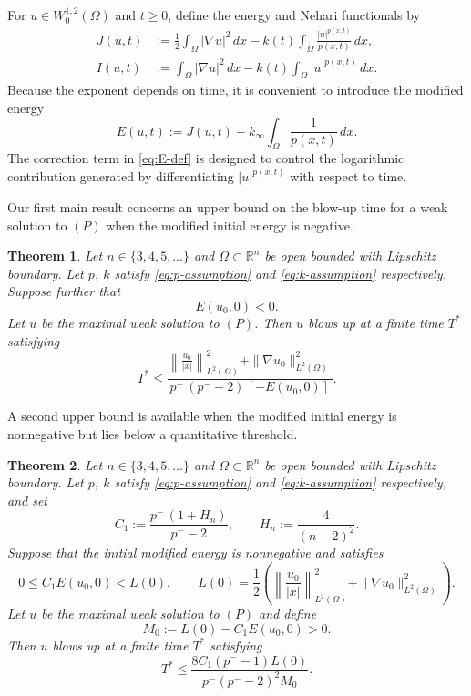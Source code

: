 \documentclass[12pt,reqno]{amsart}
\newtheorem{theorem}{Theorem}[section]
\theoremstyle{definition}
\theoremstyle{remark}
\numberwithin{equation}{section}
\newcommand{\R}{\mathbb{R}}
\begin{document}
For $u\in W^{1,2}_0(\Omega)$ and $t\ge0$, define the energy and Nehari functionals by
\begin{align}
J(u,t)
&:=\frac12\int_\Omega |\nabla u|^2\,dx
-k(t)\int_\Omega \frac{|u|^{p(x,t)}}{p(x,t)}\,dx,
\label{eq:J-def}\\
I(u,t)
&:=\int_\Omega |\nabla u|^2\,dx
-k(t)\int_\Omega |u|^{p(x,t)}\,dx.
\label{eq:I-def}
\end{align}
Because the exponent depends on time, it is convenient to introduce the modified energy
\begin{equation}\label{eq:E-def}
E(u,t):=J(u,t)+k_\infty\int_\Omega \frac{1}{p(x,t)}\,dx.
\end{equation}
The correction term in \eqref{eq:E-def} is designed to control the logarithmic contribution generated by differentiating $|u|^{p(x,t)}$ with respect to time.


Our first main result concerns an upper bound on the blow-up time for a weak solution to $(P)$ when the modified initial energy is negative.


\begin{theorem} \label{thm:negative}
	Let $n \in \{3,4,5,\ldots\}$ and $\Omega \subset \R^n$ be open bounded with Lipschitz boundary. 
	Let $p$, $k$ satisfy \eqref{eq:p-assumption} and \eqref{eq:k-assumption} respectively.
	Suppose further that 
	\[
	E(u_0,0) < 0.
	\]
	Let $u$ be the maximal weak solution to $(P)$.
	Then $u$ blows up at a finite time $T^*$ satisfying
	\[
	T^* 
	\le \frac{\left\| \displaystyle\frac{u_0}{|x|} \right\|_{L^2(\Omega)}^2+\|\nabla u_0\|_{L^2(\Omega)}^2}
	{p^- \, (p^- - 2) \, [-E(u_0,0)]}.
	\]
\end{theorem}


A second upper bound is available when the modified initial energy is nonnegative but lies below a quantitative threshold.


\begin{theorem} \label{thm:positive}
	Let $n \in \{3,4,5,\ldots\}$ and $\Omega \subset \R^n$ be open bounded with Lipschitz boundary.
	Let $p$, $k$ satisfy \eqref{eq:p-assumption} and \eqref{eq:k-assumption} respectively, and set
	\[
	C_1:=\frac{p^-\,(1+H_n)}{p^- -2},
	\qquad H_n:=\frac{4}{(n-2)^2}.
	\]
	Suppose that the initial modified energy is nonnegative and satisfies
	\[
	0\le C_1E(u_0,0)<L(0),
	\qquad
	L(0)=\frac12\left(
	\left\|\frac{u_0}{|x|}\right\|_{L^2(\Omega)}^2
	+\|\nabla u_0\|_{L^2(\Omega)}^2
	\right).
	\]
	Let $u$ be the maximal weak solution to $(P)$ and define
	\[
	M_0:=L(0)-C_1E(u_0,0)>0.
	\]
	Then $u$ blows up at a finite time $T^*$ satisfying
	\[
	T^*\le
	\frac{8C_1(p^- -1)L(0)}
	{p^-(p^- -2)^2M_0}.
	\]
\end{theorem}
\end{document}
